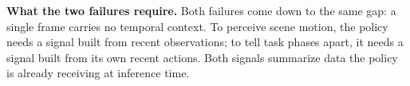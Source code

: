 \noindent\textbf{What the two failures require.}
Both failures come down to the same gap: a single frame carries no temporal context. To perceive scene motion, the policy needs a signal built from recent observations; to tell task phases apart, it needs a signal built from its own recent actions. Both signals summarize data the policy is already receiving at inference time.

